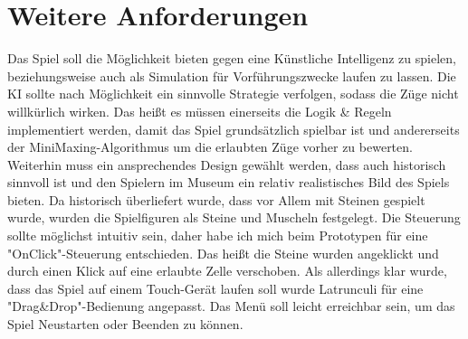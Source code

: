 \section{Weitere Anforderungen}
\label{ch:Analyse:sec:Anforderungen}
Das Spiel soll die Möglichkeit bieten gegen eine Künstliche Intelligenz zu spielen, beziehungsweise auch als Simulation für Vorführungszwecke laufen zu lassen. Die KI sollte nach Möglichkeit ein sinnvolle Strategie verfolgen, sodass die Züge nicht willkürlich wirken. Das heißt es müssen einerseits die Logik \& Regeln implementiert werden, damit das Spiel grundsätzlich spielbar ist und andererseits der MiniMaxing-Algorithmus um die erlaubten Züge vorher zu bewerten. Weiterhin muss ein ansprechendes Design gewählt werden, dass auch historisch sinnvoll ist und den Spielern im Museum ein relativ realistisches Bild des Spiels bieten. Da historisch überliefert wurde, dass vor Allem mit Steinen gespielt wurde, wurden die Spielfiguren als Steine und Muscheln festgelegt. Die Steuerung sollte möglichst intuitiv sein, daher habe ich mich beim Prototypen für eine "OnClick"-Steuerung entschieden. Das heißt die Steine wurden angeklickt und durch einen Klick auf eine erlaubte Zelle verschoben. Als allerdings klar wurde, dass das Spiel auf einem Touch-Gerät laufen soll wurde Latrunculi für eine "Drag\&Drop"-Bedienung angepasst. Das Menü soll leicht erreichbar sein, um das Spiel Neustarten oder Beenden zu können.






